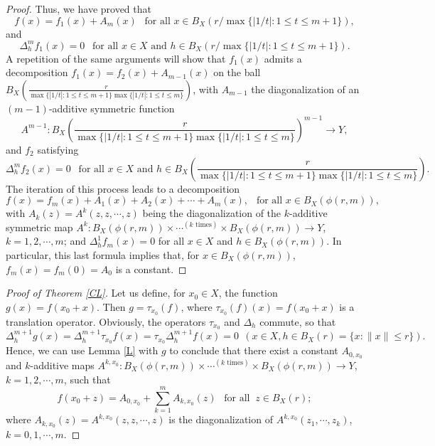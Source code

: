 \documentclass[12pt,a4paper]{amsart}
\theoremstyle{definition}
\begin{document}
\begin{proof}
Thus, we have proved that  
\begin{equation*} 
f(x)=f_1(x)+A_m(x) \ \ \text{ for all } x\in B_{X}(r/\max\{|1/t|:1\leq t\leq m+1\}),
\end{equation*}
and 
\begin{equation*} 
\Delta_h^{m}f_1(x)=0 \ \ \text{ for all } x\in X \text{ and } h\in B_{X}(r/\max\{|1/t|:1\leq t\leq m+1\}).
\end{equation*}
A repetition of the same arguments will show that $f_1(x)$ admits a decomposition $f_1(x)=f_2(x)+A_{m-1}(x)$ on the ball   
$ B_{X}(\frac{r}{\max\{|1/t|:1\leq t\leq m+1\}\max\{|1/t|:1\leq t\leq m\}})$, with $A_{m-1}$ the diagonalization of an $(m-1)$-additive symmetric function 
\[A^{m-1}:B_{X}(\frac{r}{\max\{|1/t|:1\leq t\leq m+1\}\max\{|1/t|:1\leq t\leq m\}})^{m-1}\to Y,
\]  
and $f_2$ satisfying 
\begin{equation*} 
\Delta_h^{m}f_2(x)=0 \ \ \text{ for all } x\in X \text{ and } h\in B_{X}(\frac{r}{\max\{|1/t|:1\leq t\leq m+1\}\max\{|1/t|:1\leq t\leq m\}}).
\end{equation*}
The iteration of this process leads to a decomposition 
\[
f(x)=f_{m}(x)+A_1(x)+A_2(x)+\cdots+A_m(x), \ \ \text{ for all } x\in B_X(\phi(r,m)), 
\]
with  $A_{k}(z)=A^{k}(z,z,\cdots,z)$ being the diagonalization of the 
$k$-additive symmetric  map 
$A^{k}:B_X(\phi(r,m))\times\cdots ^{(k\text{ times})}\times B_X(\phi(r,m))\to Y$, $k=1,2,\cdots,m$; and 
$\Delta^1_hf_m(x)=0$ for all $x\in X$ and $h\in   B_X(\phi(r,m))$. In particular, this last formula implies that, for $x\in  B_X(\phi(r,m))$, $f_m(x)=f_m(0)=A_0$ is a constant. 
 \end{proof} 

\begin{proof}[Proof of Theorem \ref{CL}] Let us define, for $x_0\in X$, the function $g(x)=f(x_0+x)$. Then $g=\tau_{x_0}(f)$, where $\tau_{x_0}(f)(x)=f(x_0+x)$ is a translation operator. Obviously, the operators $\tau_{x_0}$ and $\Delta_h$ commute, so that
\[
\Delta_h^{m+1}g(x)=\Delta_h^{m+1}\tau_{x_0}f(x)=\tau_{x_0}\Delta_h^{m+1}f(x)=0 \ \ (x\in X, h\in B_X(r)=\{x:\|x\|\leq r\}).
\]
Hence, we can use Lemma \ref{L} with $g$ to conclude that there exist a constant $A_{0,x_0}$ and  $k$-additive maps $A^{k,x_0}:B_X(\phi(r,m))\times\cdots^{(k \text{ times})}\times B_X(\phi(r,m))\to Y$, $k=1,2,\cdots,m$, such that 
\[
f(x_0+z)=A_{0,x_0}+\sum_{k=1}^mA_{k,x_0}(z) \  \ \text{ for all } \ z\in B_X(r);
\]  
where $A_{k,x_0}(z)=A^{k,x_0}(z,z,\cdots,z)$ is the diagonalization of $A^{k,x_0}(z_1,\cdots,z_k)$, $k=0,1,\cdots,m$.
\end{proof}
\end{document}
